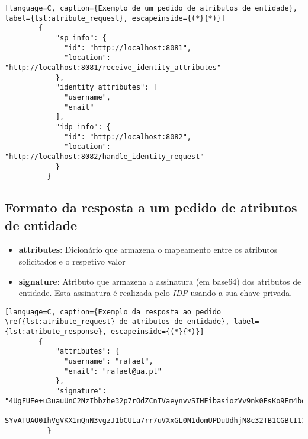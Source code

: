 \begin{minipage}{\linewidth}
    \begin{lstlisting}[language=C, caption={Exemplo de um pedido de atributos de entidade}, label={lst:atribute_request}, escapeinside={(*}{*)}]
        {
            "sp_info": {
              "id": "http://localhost:8081",
              "location": "http://localhost:8081/receive_identity_attributes"
            },
            "identity_attributes": [
              "username",
              "email"
            ],
            "idp_info": {
              "id": "http://localhost:8082",
              "location": "http://localhost:8082/handle_identity_request"
            }
          }
    \end{lstlisting}
\end{minipage}

\subsection{Formato da resposta a um pedido de atributos de entidade}

\begin{itemize}
    \item \textbf{attributes}: Dicionário que armazena o mapeamento entre os atributos solicitados e o respetivo valor
    \item \textbf{signature}: Atributo que armazena a assinatura (em base64) dos atributos de entidade. Esta assinatura é realizada pelo \textit{IDP} usando a sua chave privada.
\end{itemize} 


\begin{minipage}{\linewidth}
    \begin{lstlisting}[language=C, caption={Exemplo da resposta ao pedido \ref{lst:atribute_request} de atributos de entidade}, label={lst:atribute_response}, escapeinside={(*}{*)}]
        {
            "attributes": {
              "username": "rafael",
              "email": "rafael@ua.pt"
            },
            "signature": "4UgFUEe+u3uauUnC2NzIbbzhe32p7rOdZCnTVaeynvvSIHEibasiozVv9nk0EsKo9Em4bqp0ms3WHrpC9C6gej
            SYvATUAO0IhVgVKX1mQnN3vgzJ1bCULa7rr7uVXxGL0N1domUPDuUdhjN8c32TB1CGBtI11G8qUQGfrn8APDc="
          }
    \end{lstlisting}
\end{minipage}